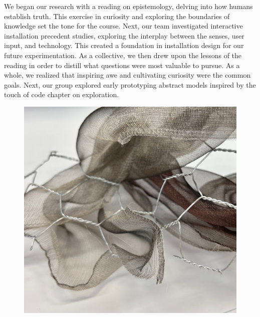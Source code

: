\documentclass{article}
\begin{document}
We began our research with a reading on epistemology, delving into how humans establish truth. This exercise in curiosity and exploring the boundaries of knowledge set the tone for the course. Next, our team investigated interactive installation precedent studies, exploring the interplay between the senses, user input, and technology. This created a foundation in installation design for our future experimentation. As a collective, we then drew upon the lessons of the reading in order to distill what questions were most valuable to pursue. As a whole, we realized that inspiring awe and cultivating curiosity were the common goals. Next, our group explored early prototyping abstract models inspired by the touch of code chapter on exploration. 
\begin{figure} [h]
    \centering
  \begin{minipage}[b]{0.4\textwidth}
    \includegraphics[width=\textwidth]{images/unnamed.jpg}
  \end{minipage}
  \hfill
  \begin{minipage}[b]{0.4\textwidth}

\end{minipage}
\end{figure}
\end{document}
